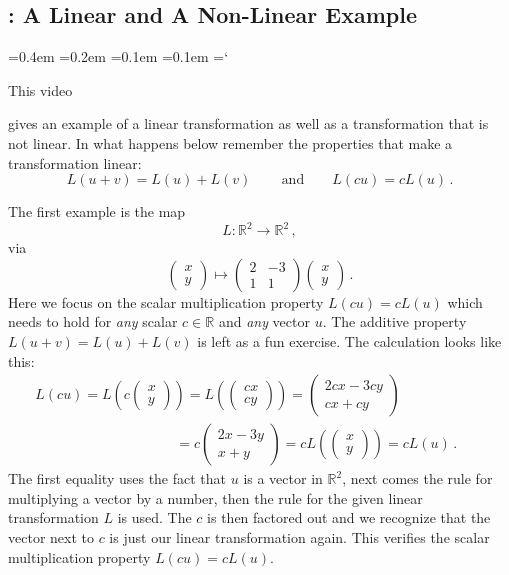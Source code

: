 
\subsection{\linTransTitle: A Linear and A Non-Linear Example}

{\ttfamily
{}\font=0.4em
\font=0.2em
\font=0.1em
\font=0.1em
\hyphenchar\font=`\-


\hypertarget{scripts_linear_transformations_example}{This video} gives
an example of  a linear transformation as well as a transformation that
is not linear. In what happens below remember the properties that 
make a transformation linear:
\[
L(u+v)=L(u)+L(v)\, \qquad\mbox{and} \qquad L(cu)=cL(u)\, .
\]


The first example is the map
\[
L:{\mathbb R}^2\longrightarrow {\mathbb R}^2\, ,
\]
via
\[
\begin{pmatrix}
x\\y
\end{pmatrix}
\mapsto 
\begin{pmatrix}
2&-3\\1&1
\end{pmatrix}
\begin{pmatrix}
x\\y
\end{pmatrix}\, .
\]
Here we focus on the scalar multiplication property $L(cu)=cL(u)$ which needs to hold for {\itshape any} scalar $c\in {\mathbb R}$
and {\itshape any} vector $u$. The additive property $L(u+v)=L(u)+L(v)$ is left as a fun exercise.
The calculation looks like this:
\begin{multline*}
L(cu)=L\left(c\begin{pmatrix}
x\\y
\end{pmatrix}\right)
=L\left(\begin{pmatrix}
cx\\cy
\end{pmatrix}\right)
=
\begin{pmatrix}
2cx-3cy\\cx+cy
\end{pmatrix}\qquad\qquad\qquad
\\
\qquad\qquad\qquad\qquad\qquad
=
c\begin{pmatrix}
2x-3y\\x+y
\end{pmatrix}
=cL\left(\begin{pmatrix}
x\\y
\end{pmatrix}\right)=cL(u)\, .
\end{multline*}
The first equality uses the fact that $u$ is a vector in ${\mathbb R}^2$, next comes the
rule for multiplying a vector by a number, then the rule for the given linear transformation $L$ is used.
The $c$ is then factored out and we recognize that the vector next to $c$ is just our linear transformation again.
This verifies the scalar multiplication property $L(cu)=cL(u)$.

}
